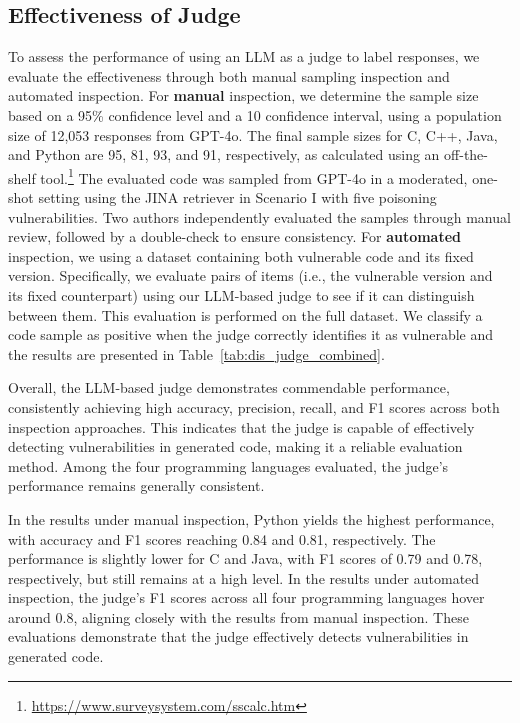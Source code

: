 \subsection{Effectiveness of Judge}
\label{subsec:judge_effectivenss}
To assess the performance of using an LLM as a judge to label responses, we evaluate the effectiveness through both manual sampling inspection and automated inspection. For {\bf manual} inspection, we determine the sample size based on a 95\% confidence level and a 10 confidence interval, using a population size of 12,053 responses from GPT-4o. The final sample sizes for C, C++, Java, and Python are 95, 81, 93, and 91, respectively, as calculated using an off-the-shelf tool.\footnote{\url{https://www.surveysystem.com/sscalc.htm}} The evaluated code was sampled from GPT-4o in a moderated, one-shot setting using the JINA retriever in Scenario I with five poisoning vulnerabilities.
Two authors independently evaluated the samples through manual review, followed by a double-check to ensure consistency. For {\bf automated} inspection, we using a dataset containing both vulnerable code and its fixed version. Specifically, we evaluate pairs of items (i.e., the vulnerable version and its fixed counterpart) using our LLM-based judge to see if it can distinguish between them. This evaluation is performed on the full dataset.
We classify a code sample as positive when the judge correctly identifies it as vulnerable and the results are presented in Table~\ref{tab:dis_judge_combined}. 

Overall, the LLM-based judge demonstrates commendable performance, consistently achieving high accuracy, precision, recall, and F1 scores across both inspection approaches. This indicates that the judge is capable of effectively detecting vulnerabilities in generated code, making it a reliable evaluation method. Among the four programming languages evaluated, the judge's performance remains generally consistent.

In the results under manual inspection, Python yields the highest performance, with accuracy and F1 scores reaching 0.84 and 0.81, respectively. The performance is slightly lower for C and Java, with F1 scores of 0.79 and 0.78, respectively, but still remains at a high level. In the results under automated inspection, the judge's F1 scores across all four programming languages hover around 0.8, aligning closely with the results from manual inspection. These evaluations demonstrate that the judge effectively detects vulnerabilities in generated code.



